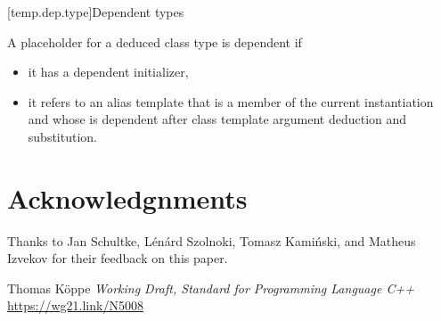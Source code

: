 \documentclass{wg21}
\begin{document}
[temp.dep.type]{Dependent types}

\pnum
A placeholder for a deduced class type 
is dependent if
\begin{itemize}
    \item
    it has a dependent initializer, 
    \item
    it refers to an alias template
    that is a member of the current instantiation and
    whose  is dependent after
    class template argument deduction
    and substitution.
\end{itemize}


\section{Acknowledgnments}

Thanks to Jan Schultke, Lénárd Szolnoki, Tomasz Kamiński, and Matheus Izvekov for their feedback on this paper.




\renewcommand{\section}[2]{}%

\begin{thebibliography}{9}


Thomas Köppe
\emph{Working Draft, Standard for Programming Language C++}\newline
\url{https://wg21.link/N5008}


\end{thebibliography}
\end{document}
